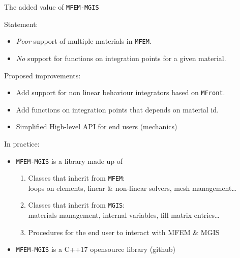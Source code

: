 \documentclass{beamer}
\providecommand{\tightlist}{%
  \setlength{\itemsep}{0pt}\setlength{\parskip}{0pt}}
\begin{document}
\begin{frame}[fragile]{The added value of \texttt{MFEM-MGIS}}
\begin{block}{Statement:}
\protect\hypertarget{statement}{}
\begin{itemize}
\tightlist
\item
  \emph{Poor} support of multiple materials in \texttt{MFEM}.
\item
  \emph{No} support for functions on integration points for a given
  material.
\end{itemize}

\vspace*{-1mm}
\end{block}

\begin{block}{Proposed improvements:}
\protect\hypertarget{proposed-improvements}{}
\begin{itemize}
\tightlist
\item
  Add support for non linear behaviour integrators based on
  \texttt{MFront}.
\item
  Add functions on integration points that depends on material id.
\item
  Simplified High-level API for end users (mechanics)
\end{itemize}

\vspace*{-1mm}
\end{block}

\begin{block}{In practice:}
\protect\hypertarget{in-practice}{}
\begin{itemize}
\tightlist
\item
  \texttt{MFEM-MGIS} is a library made up of

  \begin{enumerate}
  \tightlist
  \item
    Classes that inherit from \texttt{MFEM}:\\
    loops on elements, linear \& non-linear solvers, mesh
    management\ldots{}
  \item
    Classes that inherit from \texttt{MGIS}:\\
    materials management, internal variables, fill matrix
    entries\ldots{}
  \item
    Procedures for the end user to interact with MFEM \& MGIS
  \end{enumerate}
\item
  \texttt{MFEM-MGIS} is a C++17 opensource library (github)
\end{itemize}

\vspace*{-1mm}
\end{block}
\end{frame}
\end{document}
